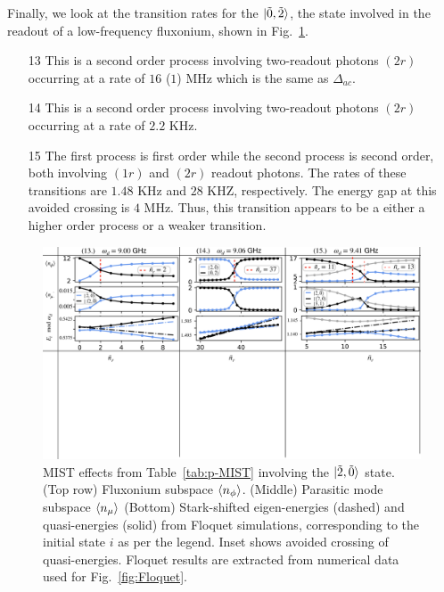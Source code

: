 \documentclass[%
reprint,
superscriptaddress,
 amsmath,amssymb,
 aps,
 prx,
longbibliography,
floatfix,
]{revtex4-2}
\begin{document}
Finally, we look at the transition rates for the $\ket{\tilde{0},\tilde{2}}$, the state involved in the readout of a low-frequency fluxonium, shown in Fig.~\ref{fig:Trans2}.
\begin{itemize}
    \item[13] This is a second order process involving two-readout photons $(2r)$ occurring at a rate of $16$ ($1$) MHz which is the same as $\Delta_{ac}$.
    \item[14] This is a second order process involving two-readout photons $(2r)$ occurring at a rate of $2.2$ KHz.
    \item[15] The first process is first order while the second process is second order, both involving $(1r)$ and $(2r)$ readout photons. The rates of these transitions are $1.48$ KHz and $28$ KHZ, respectively. The energy gap at this avoided crossing is $4$ MHz. Thus, this transition appears to be a either a higher order process or a weaker transition.
\end{itemize}
\begin{figure}
    \centering
    \includegraphics[width=1.0\textwidth]{Figures/Trans2.pdf}
    \caption{MIST effects from Table~\ref{tab:p-MIST} involving the $\ket{\tilde{2},\tilde{0}}$ state. (Top row) Fluxonium subspace $\braket{n_\phi}$. (Middle) Parasitic mode subspace $\braket{n_\mu}$ (Bottom) Stark-shifted eigen-energies (dashed) and quasi-energies (solid) from Floquet simulations, corresponding to the initial state $i$ as per the legend. Inset shows avoided crossing of quasi-energies. Floquet results are extracted from numerical data used for Fig.~\ref{fig:Floquet}.}
    \label{fig:Trans2}
\end{figure}
\end{document}
